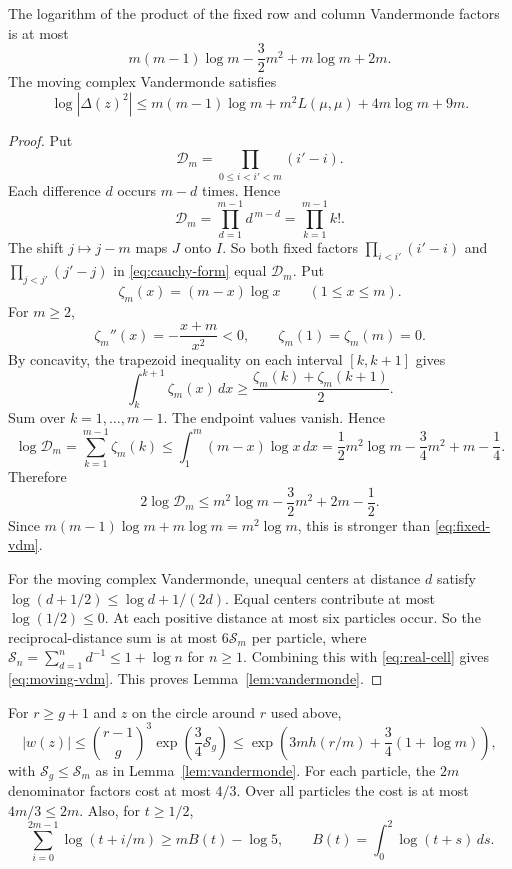 \begin{lemma}\label{lem:vandermonde}
The logarithm of the product of the fixed row and column Vandermonde factors is at most
\begin{equation}\label{eq:fixed-vdm}
 m(m-1)\log m-\frac32m^2+m\log m+2m.
\end{equation}
The moving complex Vandermonde satisfies
\begin{equation}\label{eq:moving-vdm}
 \log|\Delta(z)^2|
 \le m(m-1)\log m+m^2L(\mu,\mu)+4m\log m+9m.
\end{equation}
\end{lemma}

\begin{proof}
Put
\[
 \mathcal D_m=\prod_{0\le i<i'<m}(i'-i).
\]
Each difference \(d\) occurs \(m-d\) times. Hence
\[
 \mathcal D_m=\prod_{d=1}^{m-1}d^{\,m-d}=\prod_{k=1}^{m-1}k!.
\]
The shift \(j\mapsto j-m\) maps \(J\) onto \(I\). So both fixed factors \(\prod_{i<i'}(i'-i)\) and \(\prod_{j<j'}(j'-j)\) in \eqref{eq:cauchy-form} equal \(\mathcal D_m\). Put
\[
 \zeta_m(x)=(m-x)\log x\qquad(1\le x\le m).
\]
For \(m\ge2\),
\[
 \zeta_m''(x)=-\frac{x+m}{x^2}<0,\qquad \zeta_m(1)=\zeta_m(m)=0.
\]
By concavity, the trapezoid inequality on each interval \([k,k+1]\) gives
\[
 \int_k^{k+1}\zeta_m(x)\,dx
 \ge\frac{\zeta_m(k)+\zeta_m(k+1)}2.
\]
Sum over \(k=1,\ldots,m-1\). The endpoint values vanish. Hence
\[
 \log \mathcal D_m=\sum_{k=1}^{m-1}\zeta_m(k)
 \le\int_1^m(m-x)\log x\,dx
 =\frac12m^2\log m-\frac34m^2+m-\frac14.
\]
Therefore
\[
 2\log \mathcal D_m
 \le m^2\log m-\frac32m^2+2m-\frac12.
\]
Since \(m(m-1)\log m+m\log m=m^2\log m\), this is stronger than \eqref{eq:fixed-vdm}.

For the moving complex Vandermonde, unequal centers at distance \(d\) satisfy \(\log(d+1/2)\le\log d+1/(2d)\). Equal centers contribute at most \(\log(1/2)\le0\). At each positive distance at most six particles occur. So the reciprocal-distance sum is at most \(6\mathcal S_m\) per particle, where \(\mathcal S_n=\sum_{d=1}^n d^{-1}\le1+\log n\) for \(n\ge1\). Combining this with \eqref{eq:real-cell} gives \eqref{eq:moving-vdm}. This proves Lemma~\ref{lem:vandermonde}.
\end{proof}

\begin{lemma}\label{lem:weight}
For \(r\ge g+1\) and \(z\) on the circle around \(r\) used above,
\begin{equation}\label{eq:weight}
 |w(z)|\le \binom{r-1}{g}^{3}\exp\!\left(\frac34\mathcal S_g\right)
 \le \exp\!\left(3m h(r/m)+\frac34(1+\log m)\right),
\end{equation}
with \(\mathcal S_g\le\mathcal S_m\) as in Lemma~\ref{lem:vandermonde}. For each particle, the \(2m\) denominator factors cost at most \(4/3\). Over all particles the cost is at most \(4m/3\le2m\). Also, for \(t\ge1/2\),
\begin{equation}\label{eq:riemann}
 \sum_{i=0}^{2m-1}\log(t+i/m)\ge mB(t)-\log5,\qquad
 B(t)=\int_0^2\log(t+s)\,ds.
\end{equation}
\end{lemma}


